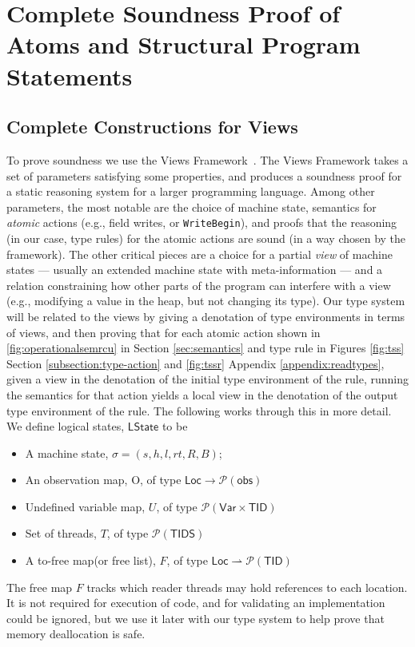 \section{Complete Soundness Proof of Atoms and Structural Program Statements}
\subsection{Complete Constructions for \textsf{Views}}
\label{sec:prooflemmas}
To prove soundness we use the Views Framework~\cite{views}.
The Views Framework takes a set of parameters satisfying some properties, and produces a soundness proof for a static reasoning system for a larger programming language.  Among other parameters, the most notable are the choice of machine state, semantics for \emph{atomic} actions (e.g., field writes, or \lstinline|WriteBegin|), and proofs that the reasoning (in our case, type rules) for the atomic actions are sound (in a way chosen by the framework).
The other critical pieces are a choice for a partial \emph{view} of machine states --- usually an extended machine state with meta-information --- and a relation constraining how other parts of the program can interfere with a view (e.g., modifying a value in the heap, but not changing its type).
Our type system will be related to the views by giving a denotation of type environments in terms of views, and then proving that for each atomic action shown in \ref{fig:operationalsemrcu} in Section \ref{sec:semantics} and type rule in Figures \ref{fig:tss} Section \ref{subsection:type-action} and \ref{fig:tssr} Appendix \ref{appendix:readtypes}, given a view in the denotation of the initial type environment of the rule, running the semantics for that action yields a local view in the denotation of the output type environment of the rule. The following works through this in more detail. We define logical states, $\textsf{LState}$ to be
\begin{itemize}
\item A machine state, $\sigma=(s,h,l,rt,R,B)$;
\item An observation map, O, of type $ \textsf{Loc} \to \mathcal{P}(\textsf{obs})$
\item Undefined variable map, $U$, of type $\mathcal{P}(\textsf{Var}\times \textsf{TID})$
\item Set of threads, $T$, of type $\mathcal{P}(\textsf{TIDS})$
\item A to-free map(or free list), $F$, of type $\textsf{Loc} \rightharpoonup \mathcal{P}(\textsf{TID})$
\end{itemize}
The free map $F$ tracks which reader threads may hold references to each location. It is not required for execution of code, and for validating an implementation could be ignored, but we use it later with our type system to help prove that memory deallocation is safe.

